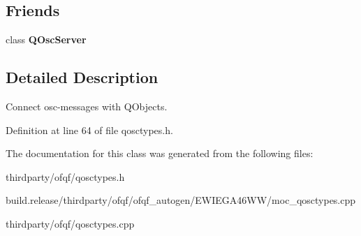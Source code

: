 \subsection*{Friends}
\begin{DoxyCompactItemize}
\item 
\mbox{\label{class_path_object_adcef846b9248b64a867dd11f8e1f9c5e}} 
class {\bfseries Q\+Osc\+Server}
\end{DoxyCompactItemize}


\subsection{Detailed Description}
Connect osc-\/messages with Q\+Objects. 

Definition at line 64 of file qosctypes.\+h.



The documentation for this class was generated from the following files\+:\begin{DoxyCompactItemize}
\item 
thirdparty/ofqf/qosctypes.\+h\item 
build.\+release/thirdparty/ofqf/ofqf\+\_\+autogen/\+E\+W\+I\+E\+G\+A46\+W\+W/moc\+\_\+qosctypes.\+cpp\item 
thirdparty/ofqf/qosctypes.\+cpp\end{DoxyCompactItemize}
